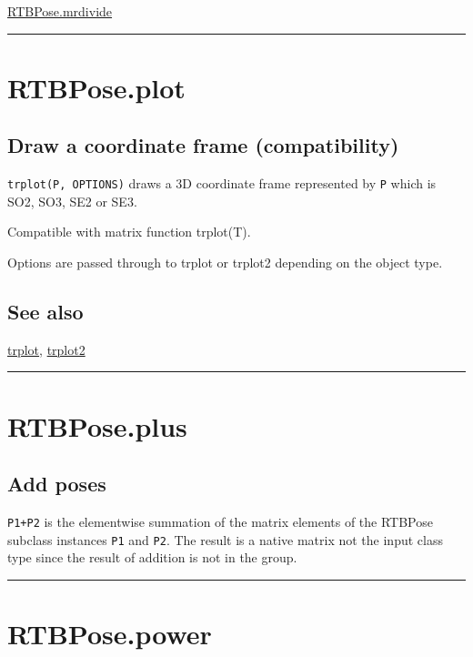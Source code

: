 \hyperlink{RTBPose.mrdivide}{\color{blue} RTBPose.mrdivide}

\vspace{1.5ex}\hrule

\hypertarget{RTBPose.plot}{\section*{RTBPose.plot}}
\subsection*{Draw a coordinate frame (compatibility)}


\texttt{trplot(P, OPTIONS)} draws a 3D coordinate frame represented by \texttt{P} which is
SO2, SO3, SE2 or SE3.



Compatible with matrix function trplot(T).



Options are passed through to trplot or trplot2 depending on the object
type.


\subsection*{See also}


\hyperlink{trplot}{\color{blue} trplot}, \hyperlink{trplot2}{\color{blue} trplot2}

\vspace{1.5ex}\hrule

\hypertarget{RTBPose.plus}{\section*{RTBPose.plus}}
\subsection*{Add poses}


\texttt{P1+P2} is the elementwise summation of the matrix elements of the
RTBPose subclass instances \texttt{P1} and \texttt{P2}.  The result is a native matrix not
the input class type since the result of addition is not in the group.

\vspace{1.5ex}\hrule

\hypertarget{RTBPose.power}{\section*{RTBPose.power}}
